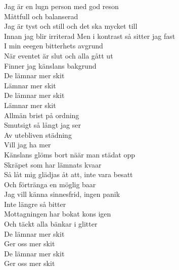 \documentclass[a6paper, 10pt, twoside]{article}
\begin{document}
\begin{center}
\end{center}
\begin{lyrics}
Jag är en lugn person med god reson\\
Måttfull och balanserad\\
Jag är tyst och still och det ska mycket till\\
Innan jag blir irriterad
Men i kontrast så sitter jag fast\\
I min eeegen bitterhets avgrund\\
När eventet är slut och alla gått ut\\
Finner jag känslans bakgrund
\vspace{5pt}\\
De lämnar mer skit\\
Lämnar mer skit\\
De lämnar mer skit\\
Lämnar mer skit\\
Allmän brist på ordning\\
Smutsigt så långt jag ser\\
Av utebliven städning\\
Vill jag ha mer
\vspace{5pt}\\
Känslans glöms bort näär man städat opp\\
Skräpet som har lämnats kvaar\\
Så låt mig glädjas åt att, inte vara besatt\\
Och förtränga en möglig baar\\
Jag vill känna sinnesfrid, ingen panik\\
Inte längre så bitter\\Mottagningen har bokat kons igen\\
Och täckt alla bänkar i glitter
\vspace{5pt}\\
De lämnar mer skit\\
Ger oss mer skit\\
De lämnar mer skit\\
Ger oss mer skit
\end{lyrics}
\end{document}
